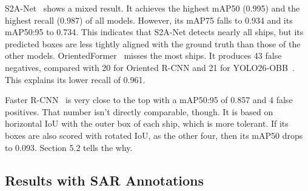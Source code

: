 S2A-Net~\cite{han2021align} shows a mixed result. It achieves the highest mAP50 (0.995) and the highest recall (0.987) of all models. However, its mAP75 falls to 0.934 and its mAP50:95 to 0.734. This indicates that S2A-Net detects nearly all ships, but its predicted boxes are less tightly aligned with the ground truth than those of the other models. OrientedFormer~\cite{zhao2024orientedformer} misses the most ships. It produces 43 false negatives, compared with 20 for Oriented R-CNN and 21 for YOLO26-OBB~\cite{jocher2026ultralytics}. This explains its lower recall of 0.961.

Faster R-CNN~\cite{7485869} is very close to the top with a mAP50:95 of 0.857 and 4 false positives. That number isn't directly comparable, though. It is based on horizontal IoU with the outer box of each ship, which is more tolerant. If its boxes are also scored with rotated IoU, as the other four, then its mAP50 drops to 0.093. Section 5.2 tells the why.

\subsection{Results with SAR Annotations}


\begin{table}[htbp]
\centering


\vspace{4pt}
\caption{Test results with SAR annotations (1068 ground-truth boxes)}
\label{tab:sar_results}
\end{table}

